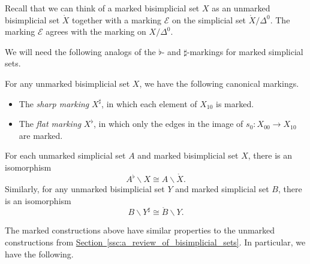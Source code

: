 \documentclass[main.tex]{subfiles}
\begin{document}
\begin{example}
  Recall that we can think of a marked bisimplicial set $X$ as an unmarked bisimplicial set $\mathring{X}$ together with a marking $\mathcal{E}$ on the simplicial set $\mathring{X} / \Delta^{0}$. The marking $\mathcal{E}$ agrees with the marking on $X / \Delta^{0}$.
\end{example}

We will need the following analogs of the $\flat$- and $\sharp$-markings for marked simplicial sets.

\begin{example}
  For any unmarked bisimplicial set $X$, we have the following canonical markings. 
  \begin{itemize}
    \item The \emph{sharp marking} $X^{\sharp}$, in which each element of $X_{10}$ is marked.

    \item The \emph{flat marking} $X^{\flat}$, in which only the edges in the image of $s_{0}\colon X_{00} \to X_{10}$ are marked.
  \end{itemize}
\end{example}

\begin{example}
  For each unmarked simplicial set $A$ and marked bisimplicial set $X$, there is an isomorphism
  \begin{equation*}
    A^{\flat} \backslash X \cong A \backslash \mathring{X}.
  \end{equation*}
  Similarly, for any unmarked bisimplicial set $Y$ and marked simplicial set $B$, there is an isomorphism
  \begin{equation*}
    B \backslash Y^{\sharp} \cong \mathring{B} \backslash Y.
  \end{equation*}
\end{example}

The marked constructions above have similar properties to the unmarked constructions from \hyperref[ssc:a_review_of_bisimplicial_sets]{Section~\ref*{ssc:a_review_of_bisimplicial_sets}}. In particular, we have the following.
\end{document}
